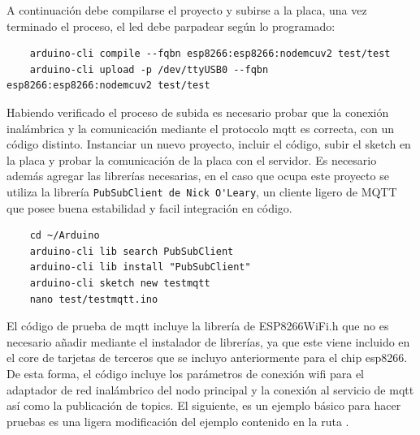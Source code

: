 A continuación debe compilarse el proyecto y subirse a la placa, una vez terminado el proceso, el led debe parpadear según lo programado:

\begin{verbatim}
    arduino-cli compile --fqbn esp8266:esp8266:nodemcuv2 test/test
    arduino-cli upload -p /dev/ttyUSB0 --fqbn esp8266:esp8266:nodemcuv2 test/test
\end{verbatim}

Habiendo verificado el proceso de subida es necesario probar que la conexión inalámbrica y la comunicación mediante el protocolo \gls{mqtt} es correcta, con un código distinto. Instanciar un nuevo proyecto, incluir el código, subir el \gls{sketch} en la placa y probar la comunicación de la placa con el servidor. Es necesario además agregar las librerías necesarias, en el caso que ocupa este proyecto se utiliza la librería \verb|PubSubClient de Nick O'Leary|, un cliente ligero de MQTT que posee buena estabilidad y facil integración en código.

\begin{verbatim}
    cd ~/Arduino
    arduino-cli lib search PubSubClient
    arduino-cli lib install "PubSubClient"
    arduino-cli sketch new testmqtt
    nano test/testmqtt.ino
\end{verbatim}

El código de prueba de \gls{mqtt} incluye la librería de ESP8266WiFi.h que no es necesario añadir mediante el instalador de librerías, ya que este viene incluido en el core de tarjetas de terceros que se incluyo anteriormente para el chip esp8266. De esta forma, el código incluye los parámetros de conexión \gls{wifi} para el adaptador de red inalámbrico del nodo principal y la conexión al servicio de \gls{mqtt} así como la publicación de topics. El siguiente, es un ejemplo básico para hacer pruebas es una ligera modificación del ejemplo contenido en la ruta .


